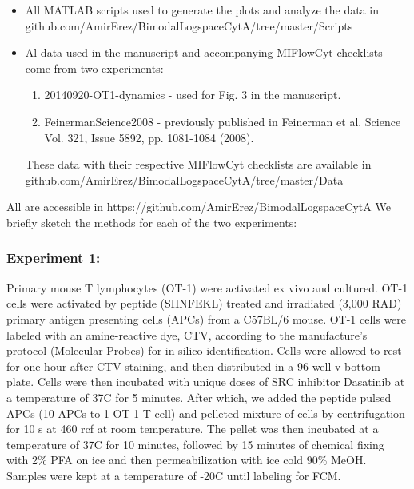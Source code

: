 \documentclass[11pt,a4paper,draft]{article}
\begin{document}
\smallskip
\begin{itemize}
\item All MATLAB scripts used to generate the plots and analyze the data in 
github.com/AmirErez/BimodalLogspaceCytA/tree/master/Scripts 
\item Al data used in the manuscript and accompanying MIFlowCyt checklists come from two experiments:
	\begin{enumerate}
	\item 20140920-OT1-dynamics - used for Fig. 3 in the manuscript.
	\item FeinermanScience2008 - previously published in Feinerman et al. Science Vol. 321, Issue 5892, pp. 1081-1084 (2008). 
	\end{enumerate}
These data with their respective MIFlowCyt checklists are available in 
github.com/AmirErez/BimodalLogspaceCytA/tree/master/Data 
\end{itemize} 
All are accessible in 
https://github.com/AmirErez/BimodalLogspaceCytA
We briefly sketch the methods for each of the two experiments:
\subsubsection*{Experiment 1:} Primary mouse T lymphocytes (OT-1) were activated ex vivo and cultured. OT-1 cells were activated by peptide (SIINFEKL) treated and irradiated (3,000 RAD) primary antigen presenting cells (APCs) from a C57BL/6 mouse. OT-1 cells were labeled with an amine-reactive dye, CTV, according to the manufacture’s protocol (Molecular Probes) for in silico identification. Cells were allowed to rest for one hour after CTV staining, and then distributed in a 96-well v-bottom plate. Cells were then incubated with unique doses of SRC inhibitor Dasatinib at a temperature of 37C for 5 minutes. After which,  we added the peptide pulsed APCs (10 APCs to 1 OT-1 T cell) and pelleted mixture of cells by centrifugation for 10 s at 460 rcf at room temperature.  The pellet was then incubated at a temperature of 37C for 10 minutes, followed by 15 minutes of chemical fixing with 2\% PFA on ice and then permeabilization with ice cold 90\% MeOH. Samples were kept at a temperature of -20C until labeling for FCM.
\end{document}
